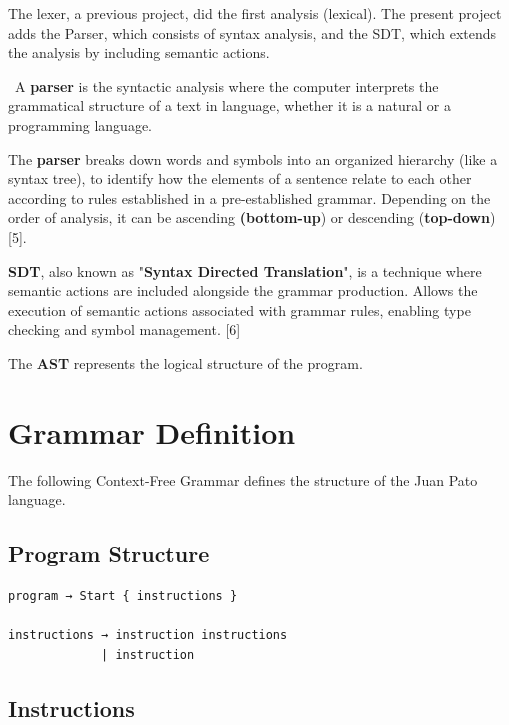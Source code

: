 \documentclass[letterpaper,12pt,oneside]{article}
\begin{document}
\bigskip

The lexer, a previous project, did the first analysis (lexical). The present project adds the Parser, which consists of syntax analysis, and the SDT, which extends the analysis by including semantic actions. 

\bigskip

\
A \textbf{parser} is the syntactic analysis where the computer interprets the grammatical structure of a text in language, whether it is a natural or a programming language. 

\bigskip

The \textbf{parser} breaks down words and symbols into an organized hierarchy (like a syntax tree), to identify how the elements of a sentence relate to each other according to rules established in a pre-established grammar. Depending on the order of analysis, it can be ascending \textbf{(bottom-up}) or descending (\textbf{top-down}) [5]. 

\bigskip

\textbf{SDT}, also known as "\textbf{Syntax Directed Translation}", is a technique where semantic actions are included alongside the grammar production. Allows the execution of semantic actions associated with grammar rules, enabling type checking and symbol management. [6]

\bigskip

The \textbf{AST} represents the logical structure of the program.


\section{Grammar Definition}

The following Context-Free Grammar defines the structure of the Juan Pato language.

\subsection{Program Structure}

\begin{lstlisting}
program → Start { instructions }

instructions → instruction instructions
             | instruction
\end{lstlisting}

\subsection{Instructions}
\end{document}
